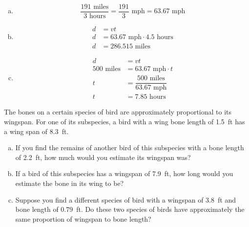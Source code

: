 \documentclass[11pt,letterpaper]{article}
\begin{document}
\sol
\begin{enumerate}[(a)]
\item 
	\[
	\dfrac{191 \text{ miles}}{3 \text{ hours}}= \dfrac{191}{3} \text{ mph}= 63.67 \text{ mph}
	\] \pspace

\item 
	\[
	\begin{aligned}
	d&= vt \\[0.3cm]
	d&= 63.67 \text{ mph} \cdot 4.5 \text{ hours} \\[0.3cm]
	d&= 286.515 \text{ miles}
	\end{aligned}
	\] \pspace

\item 
	\[
	\begin{aligned}
	d&= vt \\[0.3cm]
	500 \text{ miles}&= 63.67 \text{ mph} \cdot t \\[0.3cm]
	t&= \dfrac{500 \text{ miles}}{63.67 \text{ mph}} \\[0.3cm]
	t&= 7.85 \text{ hours}
	\end{aligned}
	\]
\end{enumerate}



\newpage



 The bones on a certain species of bird are approximately proportional to its wingspan. For one of its subspecies, a bird with a wing bone length of 1.5~ft has a wing span of 8.3~ft. 
\begin{enumerate}[(a)]
\item If you find the remains of another bird of this subspecies with a bone length of 2.2~ft, how much would you estimate its wingspan was?
\item If a bird of this subspecies has a wingspan of 7.9~ft, how long would you estimate the bone in its wing to be?
\item Suppose you find a different species of bird with a wingspan of 3.8~ft and bone length of 0.79~ft. Do these two species of birds have approximately the same proportion of wingspan to bone length?
\end{enumerate} \pspace
\end{document}
